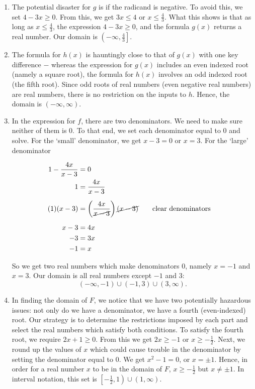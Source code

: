 {
\begin{enumerate}


\item  The potential disaster for $g$ is if the radicand is negative.  To avoid this, we set $4 - 3x \geq 0$. From this, we get $3x \leq 4$ or $x \leq \frac{4}{3}$.  What this shows is that as long as $x \leq \frac{4}{3}$, the expression $4 - 3x \geq 0$, and the formula $g(x)$ returns a real number.  Our domain is $\left(-\infty, \frac{4}{3}\right]$.

\item  The formula for $h(x)$ is hauntingly close to that of $g(x)$ with one key difference $-$ whereas the expression for $g(x)$ includes an even indexed root (namely a square root), the formula for $h(x)$ involves an odd indexed root (the fifth root).  Since odd roots of real numbers (even negative real numbers) are real numbers, there is no restriction on the inputs to $h$.  Hence, the domain is $(-\infty, \infty)$.


\item  In the expression for $f$, there are two denominators.  We need to make sure neither of them is $0$.  To that end, we set each denominator equal to $0$ and solve.  For the `small' denominator, we get $x - 3 = 0$ or $x=3$.  For the `large' denominator

\begin{align*}
1 - \dfrac{4x}{x-3} & =  0  & \\
                  1 & =  \dfrac{4x}{x-3}  \\[5pt] 
           (1)(x-3) & =  \left(\dfrac{4x}{\cancel{x-3}}\right)\cancel{(x-3)}  \tag*{clear denominators}  \\[5pt]
              x - 3 & =   4x \\
                 -3 & =  3x \\
                 -1 & =  x 
\end{align*}

So we get two real numbers which make denominators $0$, namely $x = -1$ and $x=3$.  Our domain is all real numbers except $-1$ and $3$:  
\[
(-\infty, -1) \cup (-1,3) \cup (3, \infty).
\]

\drawexampleline

\item  In finding the domain of $F$, we notice that we have two potentially hazardous issues:  not only do we have a denominator, we have a fourth (even-indexed) root.  Our strategy is to determine the restrictions imposed by each part and select the real numbers which satisfy both conditions.  To satisfy the fourth root,  we require $2x+1 \geq 0$.  From this we get $2x \geq -1$ or $x \geq -\frac{1}{2}$.  Next, we round up the values of $x$ which could cause trouble in the denominator by setting the denominator equal to $0$.  We get $x^2 - 1=0$, or $x = \pm 1$.  Hence, in order for a real number $x$ to be in the domain of $F$, $x \geq -\frac{1}{2}$ but $x \neq \pm 1$.  In interval notation, this set is $\left[ -\frac{1}{2}, 1 \right) \cup (1, \infty)$. 


\end{enumerate}}

